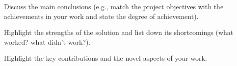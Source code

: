 \documentclass[../main.tex]{subfiles}
\begin{document}
\begin{newrequirements}
    \begin{todolist}
    \item Discuss the main conclusions (e.g., 
        match the project objectives with the 
        achievements in your work and state the 
        degree of achievement). 

    \item Highlight the strengths of the solution 
        and list down its shortcomings (what 
        worked? what didn’t work?). 

    \item Highlight the key contributions and the 
        novel aspects of your work. 

    \end{todolist}
\end{newrequirements}

\lipsum[1]
\end{document}
